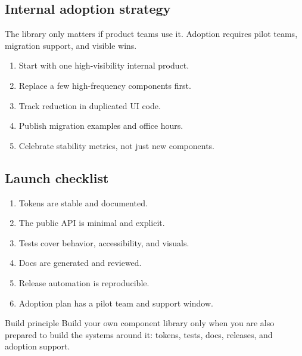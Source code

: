 \subsection{Internal adoption strategy}
The library only matters if product teams use it. Adoption requires pilot teams, migration support, and visible wins.

\begin{enumerate}[leftmargin=*, itemsep=0.35em]
  \item Start with one high-visibility internal product.
  \item Replace a few high-frequency components first.
  \item Track reduction in duplicated UI code.
  \item Publish migration examples and office hours.
  \item Celebrate stability metrics, not just new components.
\end{enumerate}

\subsection{Launch checklist}
\begin{enumerate}[leftmargin=*, itemsep=0.35em]
  \item Tokens are stable and documented.
  \item The public API is minimal and explicit.
  \item Tests cover behavior, accessibility, and visuals.
  \item Docs are generated and reviewed.
  \item Release automation is reproducible.
  \item Adoption plan has a pilot team and support window.
\end{enumerate}

\begin{highlightbox}{Build principle}
Build your own component library only when you are also prepared to build the systems around it: tokens, tests, docs, releases, and adoption support.
\end{highlightbox}
